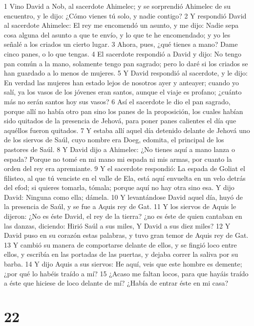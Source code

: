 1 Vino David a Nob, al sacerdote Ahimelec; y se sorprendió Ahimelec de su encuentro, y le dijo: ¿Cómo vienes tú solo, y nadie contigo?
2 Y respondió David al sacerdote Ahimelec: El rey me encomendó un asunto, y me dijo: Nadie sepa cosa alguna del asunto a que te envío, y lo que te he encomendado; y yo les señalé a los criados un cierto lugar.
3 Ahora, pues, ¿qué tienes a mano? Dame cinco panes, o lo que tengas.
4 El sacerdote respondió a David y dijo: No tengo pan común a la mano, solamente tengo pan sagrado; pero lo daré si los criados se han guardado a lo menos de mujeres.
5 Y David respondió al sacerdote, y le dijo: En verdad las mujeres han estado lejos de nosotros ayer y anteayer; cuando yo salí, ya los vasos de los jóvenes eran santos, aunque el viaje es profano; ¿cuánto más no serán santos hoy sus vasos?
6 Así el sacerdote le dio el pan sagrado, porque allí no había otro pan sino los panes de la proposición, los cuales habían sido quitados de la presencia de Jehová, para poner panes calientes el día que aquéllos fueron quitados.
7 Y estaba allí aquel día detenido delante de Jehová uno de los siervos de Saúl, cuyo nombre era Doeg, edomita, el principal de los pastores de Saúl.
8 Y David dijo a Ahimelec: ¿No tienes aquí a mano lanza o espada? Porque no tomé en mi mano mi espada ni mis armas, por cuanto la orden del rey era apremiante.
9 Y el sacerdote respondió: La espada de Goliat el filisteo, al que tú venciste en el valle de Ela, está aquí envuelta en un velo detrás del efod; si quieres tomarla, tómala; porque aquí no hay otra sino esa. Y dijo David: Ninguna como ella; dámela.
10 Y levantándose David aquel día, huyó de la presencia de Saúl, y se fue a Aquis rey de Gat.
11 Y los siervos de Aquis le dijeron: ¿No es éste David, el rey de la tierra? ¿no es éste de quien cantaban en las danzas, diciendo:
Hirió Saúl a sus miles,
Y David a sus diez miles? 
12 Y David puso en su corazón estas palabras, y tuvo gran temor de Aquis rey de Gat.
13 Y cambió su manera de comportarse delante de ellos, y se fingió loco entre ellos, y escribía en las portadas de las puertas, y dejaba correr la saliva por su barba.
14 Y dijo Aquis a sus siervos: He aquí, veis que este hombre es demente; ¿por qué lo habéis traído a mí?
15 ¿Acaso me faltan locos, para que hayáis traído a éste que hiciese de loco delante de mí? ¿Había de entrar éste en mi casa?

\chapter{22}


